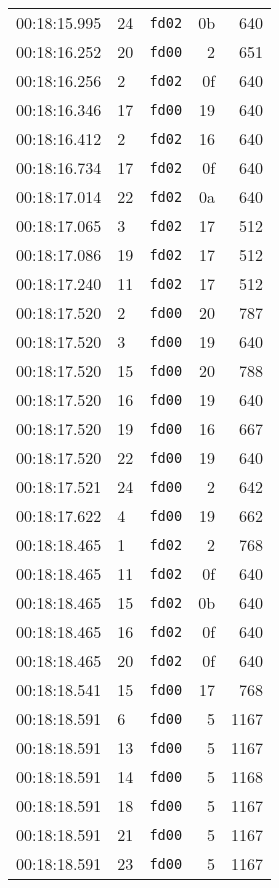 \documentclass{article}
\begin{document}
\begin{longtable}{lllrr}
00:18:15.995 & 24 & \texttt{fd02} & 0b & 640 \\
00:18:16.252 & 20 & \texttt{fd00} & 2 & 651 \\
00:18:16.256 & 2 & \texttt{fd02} & 0f & 640 \\
00:18:16.346 & 17 & \texttt{fd00} & 19 & 640 \\
00:18:16.412 & 2 & \texttt{fd02} & 16 & 640 \\
00:18:16.734 & 17 & \texttt{fd02} & 0f & 640 \\
00:18:17.014 & 22 & \texttt{fd02} & 0a & 640 \\
00:18:17.065 & 3 & \texttt{fd02} & 17 & 512 \\
00:18:17.086 & 19 & \texttt{fd02} & 17 & 512 \\
00:18:17.240 & 11 & \texttt{fd02} & 17 & 512 \\
00:18:17.520 & 2 & \texttt{fd00} & 20 & 787 \\
00:18:17.520 & 3 & \texttt{fd00} & 19 & 640 \\
00:18:17.520 & 15 & \texttt{fd00} & 20 & 788 \\
00:18:17.520 & 16 & \texttt{fd00} & 19 & 640 \\
00:18:17.520 & 19 & \texttt{fd00} & 16 & 667 \\
00:18:17.520 & 22 & \texttt{fd00} & 19 & 640 \\
00:18:17.521 & 24 & \texttt{fd00} & 2 & 642 \\
00:18:17.622 & 4 & \texttt{fd00} & 19 & 662 \\
00:18:18.465 & 1 & \texttt{fd02} & 2 & 768 \\
00:18:18.465 & 11 & \texttt{fd02} & 0f & 640 \\
00:18:18.465 & 15 & \texttt{fd02} & 0b & 640 \\
00:18:18.465 & 16 & \texttt{fd02} & 0f & 640 \\
00:18:18.465 & 20 & \texttt{fd02} & 0f & 640 \\
00:18:18.541 & 15 & \texttt{fd00} & 17 & 768 \\
00:18:18.591 & 6 & \texttt{fd00} & 5 & 1167 \\
00:18:18.591 & 13 & \texttt{fd00} & 5 & 1167 \\
00:18:18.591 & 14 & \texttt{fd00} & 5 & 1168 \\
00:18:18.591 & 18 & \texttt{fd00} & 5 & 1167 \\
00:18:18.591 & 21 & \texttt{fd00} & 5 & 1167 \\
00:18:18.591 & 23 & \texttt{fd00} & 5 & 1167 \\

\end{longtable}
\end{document}
